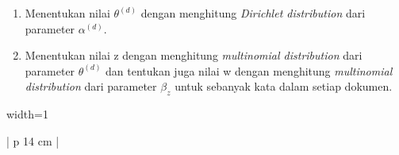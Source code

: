 \begin{enumerate}
\setcounter{enumi}{\thenumberedCntDA}
\item 
Menentukan nilai $\theta ^{(d)}$ dengan menghitung \textit{Dirichlet distribution} dari parameter $\alpha ^{(d)}$.

\item 
Menentukan nilai z dengan menghitung \textit{multinomial distribution} dari parameter $\theta ^{(d)}$ dan tentukan juga nilai w dengan menghitung \textit{multinomial distribution} dari parameter $\beta _{z}$ untuk sebanyak kata dalam setiap dokumen.

\setcounter{numberedCntDA}{\theenumi}
\end{enumerate}

\begin{table}[H]
\footnotesize
\begin{adjustbox}{width=1\textwidth}
\begin{tabular}{| p {14 cm}  |}
\hline
{}
\end{tabular}
\end{adjustbox}
\end{table}
